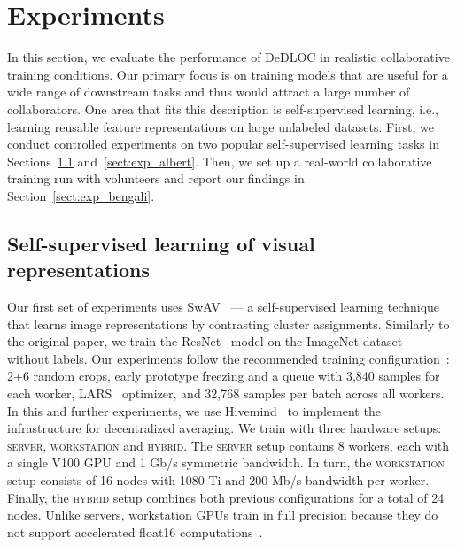 \vspace{-6pt}
\section{Experiments}\label{sect:experiments}
\vspace{-4pt}

In this section, we evaluate the performance of DeDLOC in realistic collaborative training conditions. Our primary focus is on training models that are useful for a wide range of downstream tasks and thus would attract a large number of collaborators. One area that fits this description is self-supervised learning, i.e., learning reusable feature representations on large unlabeled datasets. First, we conduct controlled experiments on two popular self-supervised learning tasks in Sections~\ref{sect:exp_swav} and~\ref{sect:exp_albert}. Then, we set up a real-world collaborative training run with volunteers and report our findings in Section~\ref{sect:exp_bengali}.

\subsection{Self-supervised learning of visual representations}\label{sect:exp_swav}

Our first set of experiments uses SwAV~\cite{swav} --- a self-supervised learning technique that learns image representations by contrasting cluster assignments. Similarly to the original paper, we train the ResNet~\cite{resnet} model on the ImageNet dataset~\cite{imagenet_cvpr09} without labels. Our experiments follow the recommended training configuration~\cite{swav,vissl}: 2+6 random crops, early prototype freezing and a queue with 3,840 samples for each worker, LARS~\cite{lars} optimizer, and 32,768 samples per batch across all workers. In this and further experiments, we use Hivemind~\cite{hivemind} to implement the infrastructure for decentralized averaging. We train with three hardware setups: \textsc{server}, \textsc{workstation} and \textsc{hybrid}. The \textsc{server} setup contains 8 workers, each with a single V100 GPU and 1 Gb/s symmetric bandwidth. In turn, the \textsc{workstation} setup consists of 16 nodes with 1080 Ti and 200 Mb/s bandwidth per worker. Finally, the \textsc{hybrid} setup combines both previous configurations for a total of 24 nodes. Unlike servers, workstation GPUs train in full precision because they do not support accelerated float16 computations~\cite{mixed_precision}.

